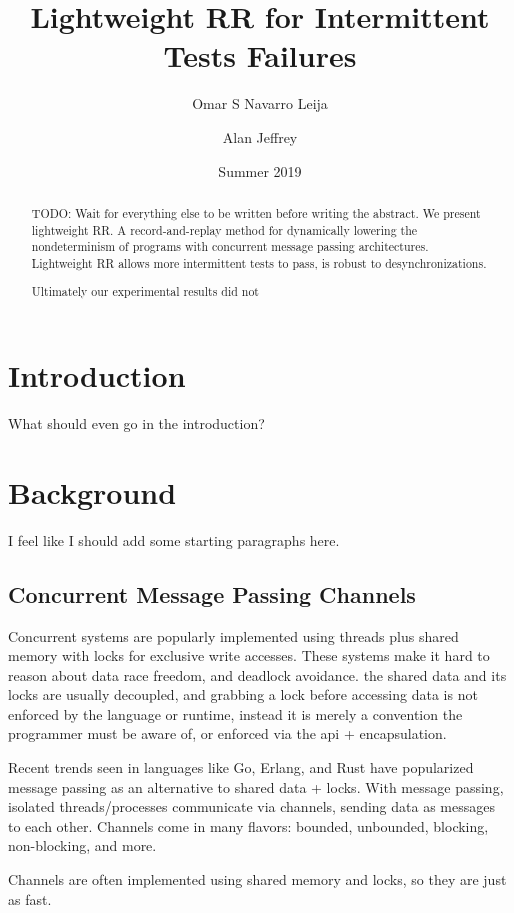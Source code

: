 \documentclass{article}
\begin{document}
\title{Lightweight RR for Intermittent Tests Failures}
\author[1]{Omar S Navarro Leija}
\author[2]{Alan Jeffrey}
\date{Summer 2019}
\maketitle

\begin{abstract}
  TODO: Wait for everything else to be written before writing the abstract.
  We present lightweight RR. A record-and-replay method for dynamically
  lowering the nondeterminism of programs with concurrent message passing
  architectures. Lightweight RR allows more intermittent tests to pass, is
  robust to desynchronizations.

  Ultimately our experimental results did not
\end{abstract}

\section{Introduction}
What should even go in the introduction?
\section{Background}
I feel like I should add some starting paragraphs here.

\subsection{Concurrent Message Passing Channels}
Concurrent systems are popularly implemented using threads plus shared memory
with locks for exclusive write accesses. These systems make it hard to reason
about data race freedom, and deadlock avoidance.
the shared data and its locks are usually decoupled, and grabbing a lock before
accessing data is not enforced by the language or runtime, instead it is merely
a convention the programmer must be aware of, or enforced via the api + encapsulation.

Recent trends seen in languages like Go, Erlang, and Rust have popularized message
passing as an alternative to shared data + locks. With message passing, isolated
threads/processes communicate via channels, sending data as messages to each other.
Channels come in many flavors: bounded, unbounded, blocking, non-blocking, and
more.

Channels are often implemented using shared memory and locks, so they are just
as fast.
\end{document}
